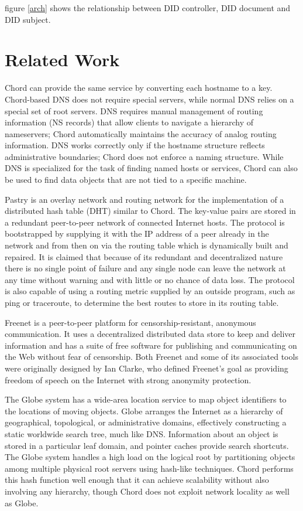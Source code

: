 \documentclass[twocolumn]{article}
\begin{document}
figure \ref{arch} shows the relationship between DID controller, DID document and DID subject.

\section{Related Work}


Chord can provide the same service by converting each hostname to a key. Chord-based\cite{chord} DNS does not require special servers, while normal DNS relies on a special set of root servers. DNS requires manual management of routing information (NS records) that allow clients to navigate a hierarchy of nameservers; Chord automatically maintains the accuracy of analog routing information. DNS works correctly only if the hostname structure reflects administrative boundaries; Chord does not enforce a naming structure. While DNS is specialized for the task of finding named hosts or services, Chord can also be used to find data objects that are not tied to a specific machine.

Pastry is an overlay network and routing network for the implementation of a distributed hash table (DHT) similar to Chord. The key-value pairs are stored in a redundant peer-to-peer network of connected Internet hosts. The protocol is bootstrapped by supplying it with the IP address of a peer already in the network and from then on via the routing table which is dynamically built and repaired. It is claimed that because of its redundant and decentralized nature there is no single point of failure and any single node can leave the network at any time without warning and with little or no chance of data loss. The protocol is also capable of using a routing metric supplied by an outside program, such as ping or traceroute, to determine the best routes to store in its routing table.

Freenet is a peer-to-peer platform for censorship-resistant, anonymous communication. It uses a decentralized distributed data store to keep and deliver information and has a suite of free software for publishing and communicating on the Web without fear of censorship. Both Freenet and some of its associated tools were originally designed by Ian Clarke, who defined Freenet's goal as providing freedom of speech on the Internet with strong anonymity protection.

The Globe system has a wide-area location service to map object identifiers to the locations of moving objects. Globe arranges the Internet as a hierarchy of geographical, topological, or administrative domains, effectively constructing a static worldwide search tree, much like DNS. Information about an object is stored in a particular leaf domain, and pointer caches provide search shortcuts. The Globe system handles a high load on the logical root by partitioning objects among multiple physical root servers using hash-like techniques. Chord performs this hash function well enough that it can achieve scalability without also involving any hierarchy, though Chord does not exploit network locality as well as Globe.
\end{document}
